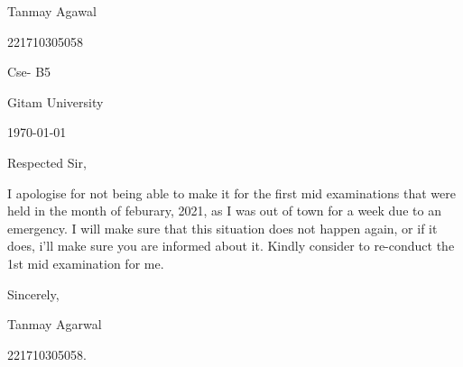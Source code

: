 \documentclass{article}
\begin{document}
\hspace*{0.9\linewidth}
\begin{minipage}{0.4\linewidth}
Tanmay Agawal \par
221710305058\par
Cse- B5\par
Gitam University\par
\today
\end{minipage}
\vspace{10mm}

Respected Sir,  \par \bigskip

I apologise for not being able to make it for the first mid examinations that were held in the month of feburary, 2021, as I was out of town for a week due to an emergency. I will make sure that this situation does not happen again, or if it does, i'll make sure you are informed about it. Kindly consider to re-conduct the 1st mid examination for me. \par \bigskip

Sincerely, \par \smallskip


Tanmay Agarwal \par
221710305058.
\end{document}
